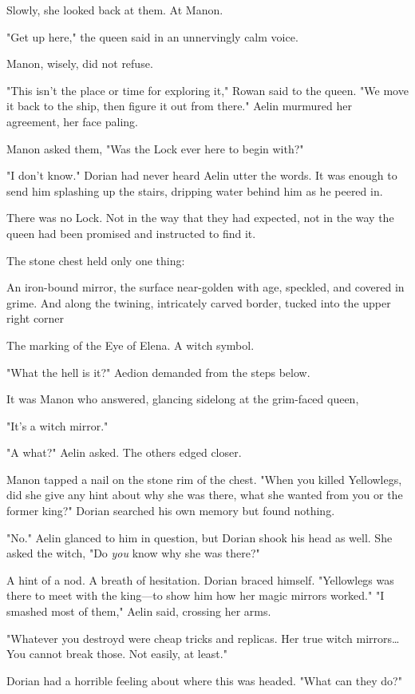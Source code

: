 Slowly, she looked back at them.
At Manon.

"Get up here," the queen said in an unnervingly calm voice.

Manon, wisely, did not refuse.

"This isn't the place or time for exploring it," Rowan said to the queen.
"We move it back to the ship, then figure it out from there."
Aelin murmured her agreement, her face paling.

Manon asked them, "Was the Lock ever here to begin with?"

"I don't know."
Dorian had never heard Aelin utter the words.
It was enough to send him splashing up the stairs, dripping water behind him as he peered in.

There was no Lock.
Not in the way that they had expected, not in the way the queen had been promised and instructed to find it.

The stone chest held only one thing:

An iron-bound mirror, the surface near-golden with age, speckled, and covered in grime.
And along the twining, intricately carved border, tucked into the upper right corner 

The marking of the Eye of Elena.
A witch symbol.

"What the hell is it?"
Aedion demanded from the steps below.

It was Manon who answered, glancing sidelong at the grim-faced queen,

"It's a witch mirror."

"A what?"
Aelin asked.
The others edged closer.

Manon tapped a nail on the stone rim of the chest.
"When you killed Yellowlegs, did she give any hint about why she was there, what she wanted from you or the former king?"
Dorian searched his own memory but found nothing.

"No."
Aelin glanced to him in question, but Dorian shook his head as well.
She asked the witch, "Do \emph{you} know why she was there?"

A hint of a nod.
A breath of hesitation.
Dorian braced himself.
"Yellowlegs was there to meet with the king---to show him how her magic mirrors worked."
"I smashed most of them," Aelin said, crossing her arms.

"Whatever you destroyd were cheap tricks and replicas.
Her true witch mirrors\ldots You cannot break those.
Not easily, at least."

Dorian had a horrible feeling about where this was headed.
"What can they do?"

